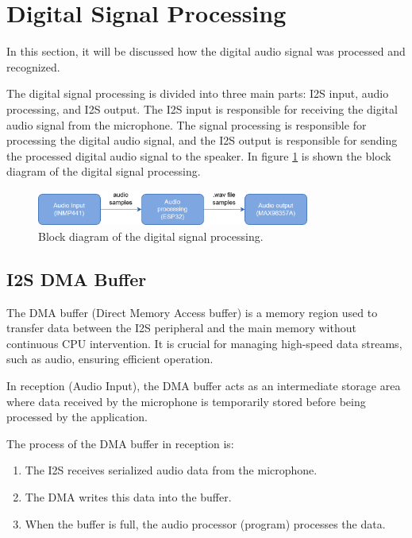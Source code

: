 \section{Digital Signal Processing}

In this section, it will be discussed how the digital audio signal was processed and recognized. 

The digital signal processing is divided into three main parts: I2S input, audio processing, and I2S output. The I2S input is responsible for receiving the digital audio signal from the microphone. The signal processing is responsible for processing the digital audio signal, and the I2S output is responsible for sending the processed digital audio signal to the speaker. In figure \ref{fig:DigitalInterface} is shown the block diagram of the digital signal processing.

\begin{figure}[H]
    \centering
    \includegraphics[width=0.8\textwidth]{Images/audio_processing_diagraampng.png}
    \caption{Block diagram of the digital signal processing.}
    \label{fig:DigitalInterface}
\end{figure}

\subsection{I2S DMA Buffer}

The DMA buffer (Direct Memory Access buffer) is a memory region used to transfer data between the I2S peripheral and the main memory without continuous CPU intervention. It is crucial for managing high-speed data streams, such as audio, ensuring efficient operation.

In reception (Audio Input), the DMA buffer acts as an intermediate storage area where data received by the microphone is temporarily stored before being processed by the application. 

The process of the DMA buffer in reception is:
\begin{enumerate}
    \item The I2S receives serialized audio data from the microphone.
    \item The DMA writes this data into the buffer.
    \item When the buffer is full, the audio processor (program) processes the data.
\end{enumerate}

